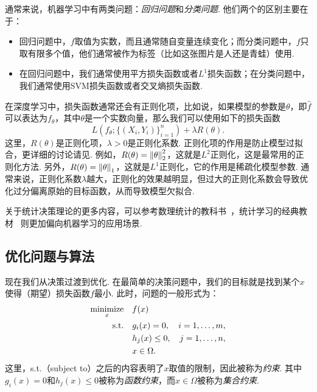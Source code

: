 通常来说，机器学习中有两类问题：\textit{回归问题}和\textit{分类问题}. 他们两个的区别主要在于：
\begin{itemize}
    \item 回归问题中，$f$取值为实数，而且通常随自变量连续变化；而分类问题中，$f$只取有限多个值，他们通常被作为标签（比如这张图片是人还是青蛙）使用.
    \item 在回归问题中，我们通常使用平方损失函数或者$L^1$损失函数；在分类问题中，我们通常使用SVM损失函数或者交叉熵损失函数.
\end{itemize}

在深度学习中，损失函数通常还会有正则化项，比如说，如果模型的参数是$\theta$，即$\hat f$可以表达为$f_\theta$，其中$\theta$是一个实数向量，那么我们可以使用如下的损失函数
\[L(f_\theta;\{(X_i,Y_i)\}_{i=1}^n)+\lambda R(\theta).\]
这里，$R(\theta)$是正则化项，$\lambda>0$是正则化系数. 正则化项的作用是防止模型过拟合，更详细的讨论请见. 例如，$R(\theta)=\left\|\theta\right\|_2^2$，这就是$L^2$正则化，这是最常用的正则化方法. 另外，$R(\theta)=\left\|\theta\right\|_1$，这就是$L^1$正则化，它的作用是稀疏化模型参数. 通常来说，正则化系数$\lambda$越大，正则化的效果越明显，但过大的正则化系数会导致优化过分偏离原始的目标函数，从而导致模型欠拟合.

\begin{remark}
    关于统计决策理论的更多内容，可以参考数理统计的教科书~\cite{shaoMathematicalStatistics2003}，统计学习的经典教材~\cite{hastieElementsStatisticalLearning2009} 则更加偏向机器学习的应用场景. 
\end{remark}

\subsection{优化问题与算法}
现在我们从决策过渡到优化. 在最简单的决策问题中，我们的目标就是找到某个$x$使得（期望）损失函数$f$最小. 此时，问题的一般形式为：
\begin{equation}
\begin{alignedat}{2}
\operatorname*{minimize}_{x}&\quad f(x)\\
\text{s.t.}&\quad g_i(x)=0,&\quad i=1,\dots,m,\\
&\quad h_j(x)\leq 0,&\quad j=1,\dots,n,\\
&\quad x\in\Omega.
\end{alignedat}
\label{eq:opt-general}
\end{equation}
这里，s.t.（subject to）之后的内容表明了$x$取值的限制，因此被称为\textit{约束}. 其中$g_i(x)=0$和$h_j(x)\leq 0$被称为\textit{函数约束}，而$x\in\Omega$被称为\textit{集合约束}.

